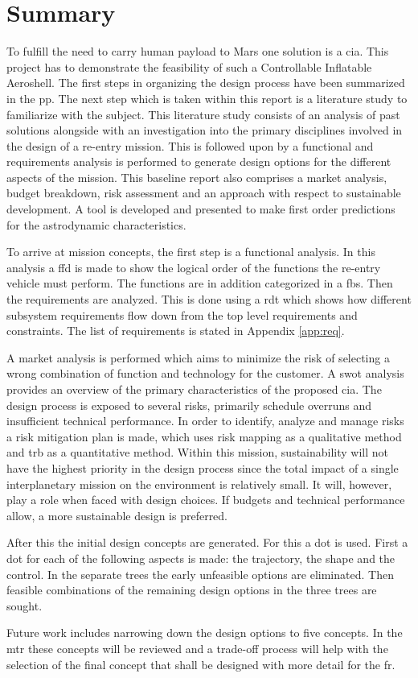 \section*{Summary}\label{cha:summary}

To fulfill the need to carry human payload to Mars one solution is a \acrfull{cia}. This project has to demonstrate the feasibility of such a Controllable Inflatable Aeroshell. The first steps in organizing the design process have been summarized in the \acrfull{pp}. The next step which is taken within this report is a literature study to familiarize with the subject. This literature study consists of an analysis of past solutions alongside with an investigation into the primary disciplines involved in the design of a re-entry mission. This is followed upon by a functional and requirements analysis is performed to generate design options for the different aspects of the mission. This baseline report also comprises a market analysis, budget breakdown, risk assessment and an approach with respect to sustainable development. A tool is developed and presented to make first order predictions for the astrodynamic characteristics. 

To arrive at mission concepts, the first step is a functional analysis. In this analysis a \acrfull{ffd} is made to show the logical order of the functions the re-entry vehicle must perform. The functions are in addition categorized in a \acrfull{fbs}. Then the requirements are analyzed. This is done using a \gls{rdt} which shows how different subsystem requirements flow down from the top level requirements and constraints. The list of requirements is stated in Appendix \ref{app:req}.

A market analysis is performed which aims to minimize the risk of selecting a wrong combination of function and technology for the customer. A \acrfull{swot} analysis provides an overview of the primary characteristics of the proposed \gls{cia}. The design process is exposed to several risks, primarily schedule overruns and insufficient technical performance. In order to identify, analyze and manage risks a risk mitigation plan is made, which uses risk mapping as a qualitative method and \gls{trb} as a quantitative method. Within this mission, sustainability will not have the highest priority in the design process since the total impact of a single interplanetary mission on the environment is relatively small. It will, however, play a role when faced with design choices. If budgets and technical performance allow, a more sustainable design is preferred.

After this the initial design concepts are generated. For this a \gls{dot} is used. First a \gls{dot} for each of the following aspects is made: the trajectory, the shape and the control. In the separate trees the early unfeasible options are eliminated. Then feasible combinations of the remaining design options in the three trees are sought.

Future work includes narrowing down the design options to five concepts. In the \acrfull{mtr} these concepts will be reviewed and a trade-off process will help with the selection of the final concept that shall be designed with more detail for the \acrfull{fr}.
